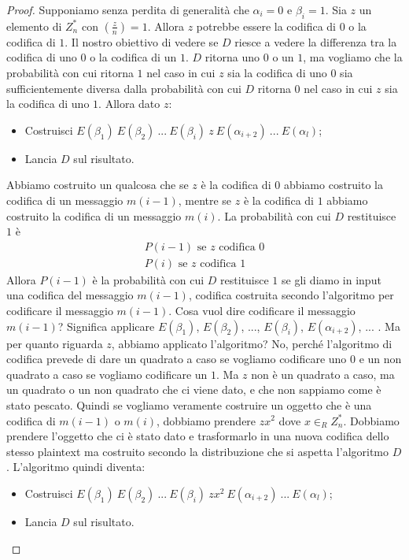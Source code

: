 \begin{proof}
Supponiamo senza perdita di generalità che $\alpha_i = 0$ e $\beta_i = 1$. Sia $z$ un elemento di $Z_n^*$ con $\left( \frac{z}{n}\right) = 1$. Allora $z$ potrebbe essere la codifica di $0$ o la codifica di $1$. Il nostro obiettivo di vedere se $D$ riesce a vedere la differenza tra la codifica di uno $0$ o la codifica di un $1$. $D$ ritorna uno $0$ o un $1$, ma vogliamo che la probabilità con cui ritorna $1$ nel caso in cui $z$ sia la codifica di uno $0$ sia sufficientemente diversa dalla probabilità con cui $D$ ritorna $0$ nel caso in cui $z$ sia la codifica di uno $1$. 
Allora dato $z$:
\begin{itemize}
    \item Costruisci $E(\beta_1) \ E(\beta_2) \ ... \ E(\beta_i) \ z \ E(\alpha_{i+2}) \ ... \ E(\alpha_l)$;
    \item Lancia $D$ sul risultato.
\end{itemize}
\noindent Abbiamo costruito un qualcosa che se $z$ è la codifica di $0$ abbiamo costruito la codifica di un messaggio $m(i-1)$, mentre se $z$ è la codifica di $1$ abbiamo costruito la codifica di un messaggio $m(i)$. La probabilità con cui $D$ restituisce $1$ è
\begin{align*}
    P(i-1) \text{ se $z$ codifica $0$}\\
    P(i) \text{ se $z$ codifica $1$}
\end{align*}
\noindent Allora $P(i-1)$ è la probabilità con cui $D$ restituisce $1$ se gli diamo in input una codifica del messaggio $m(i-1)$, codifica costruita secondo l'algoritmo per codificare il messaggio $m(i-1)$. Cosa vuol dire codificare il messaggio $m(i-1)$? Significa applicare $E(\beta_1)$, $E(\beta_2)$, ..., $E(\beta_i)$, $E(\alpha_{i+2})$, ... . Ma per quanto riguarda $z$, abbiamo applicato l'algoritmo? No, perché l'algoritmo di codifica prevede di dare un quadrato a caso se vogliamo codificare uno $0$ e un non quadrato a caso se vogliamo codificare un $1$. Ma $z$ non è un quadrato a caso, ma un quadrato o un non quadrato che ci viene dato, e che non sappiamo come è stato pescato. Quindi se vogliamo veramente costruire un oggetto che è una codifica di $m(i-1)$ o $m(i)$, dobbiamo prendere $zx^2$ dove $x \in_R Z_n^*$. Dobbiamo prendere l'oggetto che ci è stato dato e trasformarlo in una nuova codifica dello stesso plaintext ma costruito secondo la distribuzione che si aspetta l'algoritmo $D$. 
L'algoritmo quindi diventa:
\begin{itemize}
    \item Costruisci $E(\beta_1) \ E(\beta_2) \ ... \ E(\beta_i) \ zx^2 \ E(\alpha_{i+2}) \ ... \ E(\alpha_l)$;
    \item Lancia $D$ sul risultato.
\end{itemize}


\end{proof}
